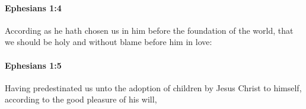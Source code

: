 		\paragraph{Ephesians 1:4} %
			\label{EPHESIANS-1-4}

			According as he hath chosen us in him before the foundation of the world, that we should be holy and without blame before him in love:

			\begin{framed}
			\scriptsize
				\begin{compactdesc}
					\item[SBLG] 
				\end{compactdesc}
			\end{framed}

		\paragraph{Ephesians 1:5} %
			\label{EPHESIANS-1-5}

			Having predestinated us unto the adoption of children by Jesus Christ to himself, according to the good pleasure of his will,


